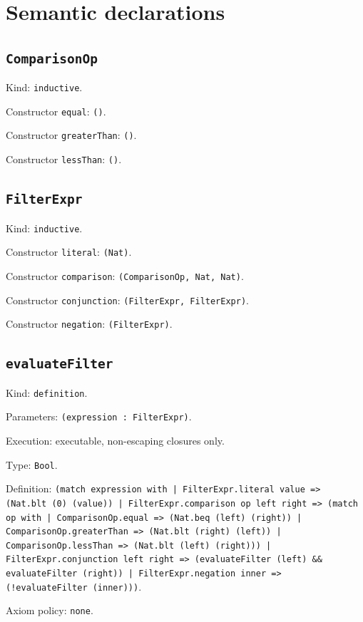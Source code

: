 \documentclass[11pt]{article}
\begin{document}
\section*{Semantic declarations}
\subsection*{\texttt{ComparisonOp}}
\noindent Kind: \texttt{inductive}.\par
\noindent Constructor \texttt{equal}: \texttt{()}.\par
\noindent Constructor \texttt{greaterThan}: \texttt{()}.\par
\noindent Constructor \texttt{lessThan}: \texttt{()}.\par
\subsection*{\texttt{FilterExpr}}
\noindent Kind: \texttt{inductive}.\par
\noindent Constructor \texttt{literal}: \texttt{(Nat)}.\par
\noindent Constructor \texttt{comparison}: \texttt{(ComparisonOp, Nat, Nat)}.\par
\noindent Constructor \texttt{conjunction}: \texttt{(FilterExpr, FilterExpr)}.\par
\noindent Constructor \texttt{negation}: \texttt{(FilterExpr)}.\par
\subsection*{\texttt{evaluateFilter}}
\noindent Kind: \texttt{definition}.\par
\noindent Parameters: \texttt{(expression : FilterExpr)}.\par
\noindent Execution: executable, non-escaping closures only.\par
\noindent Type: \texttt{Bool}.\par
\noindent Definition: \texttt{(match expression with | FilterExpr.literal value => (Nat.blt (0) (value)) | FilterExpr.comparison op left right => (match op with | ComparisonOp.equal => (Nat.beq (left) (right)) | ComparisonOp.greaterThan => (Nat.blt (right) (left)) | ComparisonOp.lessThan => (Nat.blt (left) (right))) | FilterExpr.conjunction left right => (evaluateFilter (left) \&\& evaluateFilter (right)) | FilterExpr.negation inner => (!evaluateFilter (inner)))}.\par
\noindent Axiom policy: \texttt{none}.\par
\end{document}
